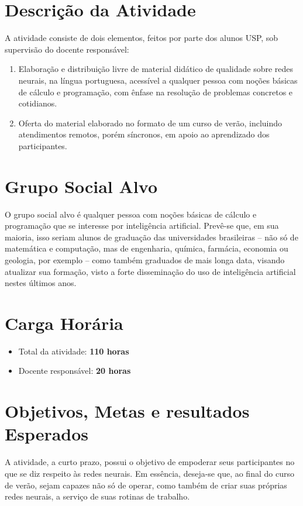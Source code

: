 \documentclass[a4paper,12pt, brazil]{article}
\begin{document}
    
    \newpage
    
    \section*{Descrição da Atividade}
    A atividade consiste de dois elementos, feitos por parte dos alunos USP, sob supervisão do docente responsável:
    \begin{enumerate}
        \item Elaboração e distribuição livre de material didático de qualidade sobre redes neurais, na língua portuguesa, acessível a qualquer pessoa com noções básicas de cálculo e programação, com ênfase na resolução de problemas concretos e cotidianos.

        \item Oferta do material elaborado no formato de um curso de verão, incluindo atendimentos remotos, porém síncronos, em apoio ao aprendizado dos participantes.
    \end{enumerate}

    \section*{Grupo Social Alvo}
    O grupo social alvo é qualquer pessoa com noções básicas de cálculo e programação que se interesse por inteligência artificial. Prevê-se que, em sua maioria, isso seriam alunos de graduação das universidades brasileiras -- não só de matemática e computação, mas de engenharia, química, farmácia, economia ou geologia, por exemplo -- como também graduados de mais longa data, visando atualizar sua formação, visto a forte disseminação do uso de inteligência artificial nestes últimos anos.

    \section*{Carga Horária}
    \begin{itemize}
        \item Total da atividade: \textbf{110 horas}
        \item Docente responsável: \textbf{20 horas}
    \end{itemize}

    \section*{Objetivos, Metas e resultados Esperados}
    A atividade, a curto prazo, possui o objetivo de empoderar seus participantes no que se diz respeito às redes neurais. Em essência, deseja-se que, ao final do curso de verão, sejam capazes não só de operar, como também de criar suas próprias redes neurais, a serviço de suas rotinas de trabalho.
\end{document}
